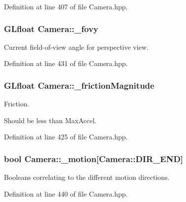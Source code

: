 Definition at line 407 of file Camera.\-hpp.

\hypertarget{class_camera_a82542bb76347e2a2bb66b3bb7842945b}{
\subsubsection[{\-\_\-fovy}]{\setlength{\rightskip}{0pt plus 5cm}G\-Lfloat Camera\-::\-\_\-fovy\hspace{0.3cm}{\ttfamily [private]}}}\label{class_camera_a82542bb76347e2a2bb66b3bb7842945b}


Current field-\/of-\/view angle for perspective view. 



Definition at line 431 of file Camera.\-hpp.

\hypertarget{class_camera_a66fb66da0ccd400c4986dc19276b6716}{
\subsubsection[{\-\_\-friction\-Magnitude}]{\setlength{\rightskip}{0pt plus 5cm}G\-Lfloat Camera\-::\-\_\-friction\-Magnitude\hspace{0.3cm}{\ttfamily [private]}}}\label{class_camera_a66fb66da0ccd400c4986dc19276b6716}


Friction. 

Should be less than Max\-Accel. 

Definition at line 425 of file Camera.\-hpp.

\hypertarget{class_camera_abec7e2becbad5a692a54a69b6a5f6d75}{
\subsubsection[{\-\_\-motion}]{\setlength{\rightskip}{0pt plus 5cm}bool Camera\-::\-\_\-motion\mbox{[}Camera\-::\-D\-I\-R\-\_\-\-E\-N\-D\mbox{]}\hspace{0.3cm}{\ttfamily [private]}}}\label{class_camera_abec7e2becbad5a692a54a69b6a5f6d75}


Booleans correlating to the different motion directions. 



Definition at line 440 of file Camera.\-hpp.


